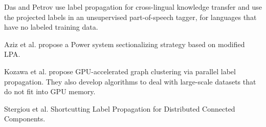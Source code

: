 {Das and Petrov \cite{das2011unsupervised} use label propagation for cross-lingual knowledge transfer and use the projected labels in an unsupervised part-of-speech tagger, for languages that have no labeled training data.

Aziz et al. \cite{aziz2023novel} propose a Power system sectionalizing strategy based on modified LPA.

Kozawa et al. \cite{kozawa2017gpu} propose GPU-accelerated graph clustering via parallel label propagation. They also develop algorithms to deal with large-scale datasets that do not fit into GPU memory.

Stergiou et al. \cite{stergiou2018shortcutting} Shortcutting Label Propagation for Distributed Connected Components.
}










